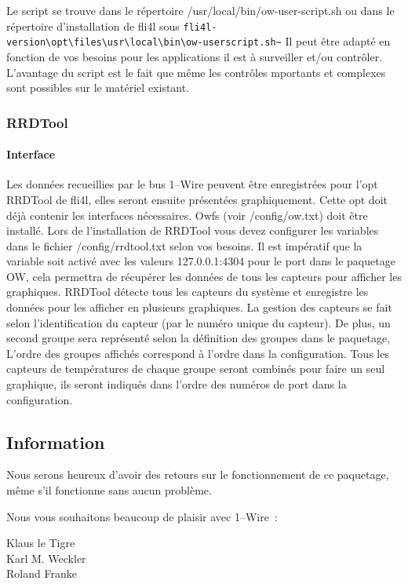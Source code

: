 Le script se trouve dans le répertoire /usr/local/bin/ow-user-script.sh ou 
dans le répertoire d'installation de fli4l sous
\verb!fli4l-version\opt\files\usr\local\bin\ow-userscript.sh~! Il peut être
adapté en fonction de vos besoins pour les applications il est à surveiller
et/ou contrôler. L'avantage du script est le fait que même les contrôles 
mportants et complexes sont possibles sur le matériel existant.

{
\subsubsection{RRDTool}
}
\paragraph{Interface}
Les données recueillies par le bus 1--Wire peuvent être enregistrées pour l'opt
\flqq{}RRDTool\frqq{} de fli4l, elles seront ensuite présentées graphiquement.
Cette opt doit déjà contenir les interfaces nécessaires. Owfs (voir /config/ow.txt)
doit être installé. Lors de l'installation de RRDTool vous devez configurer les
variables dans le fichier /config/rrdtool.txt selon vos besoins. Il est impératif que
la variable  soit activé avec les valeurs 127.0.0.1:4304 pour le port
dans le paquetage OW, cela permettra de récupérer les données de tous les capteurs pour
afficher les graphiques.
RRDTool détecte tous les capteurs du système et enregistre les données pour les afficher
en plusieurs graphiques. La gestion des capteurs se fait selon l'identification du
capteur (par le numéro unique du capteur). De plus, un second groupe sera représenté
selon la définition des groupes dans le paquetage, L'ordre des groupes affichés correspond
à l'ordre dans la configuration. Tous les capteurs de températures de chaque groupe seront
combinés pour faire un seul graphique, ils seront indiqués dans l'ordre des numéros de port
dans la configuration.

\subsection{Information}
Nous serons heureux d'avoir des retours sur le fonctionnement de ce paquetage, même s'il
fonctionne sans aucun problème.

Nous vous souhaitons beaucoup de plaisir avec 1--Wire~:

Klaus le Tigre \\
Karl M. Weckler \\
Roland Franke 
